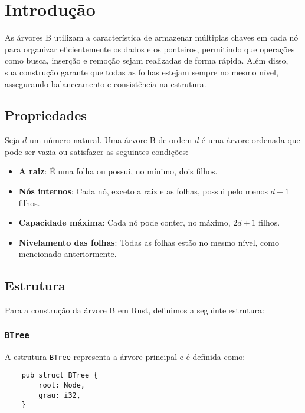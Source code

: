 \section{Introdução}

As árvores B utilizam a característica de armazenar múltiplas chaves 
em cada nó para organizar eficientemente os dados e os ponteiros, permitindo 
que operações como busca, inserção e remoção sejam realizadas de forma rápida. 
Além disso, sua construção garante que todas as folhas estejam sempre no mesmo nível, 
assegurando balanceamento e consistência na estrutura.


\subsection{Propriedades}

Seja \( d \) um número natural. Uma árvore B de ordem \( d \) é uma árvore ordenada 
que pode ser vazia ou satisfazer as seguintes condições:
\begin{itemize}
    \item \textbf{A raiz}: É uma folha ou possui, no mínimo, dois filhos.
    \item \textbf{Nós internos}: Cada nó, exceto a raiz e as folhas, possui pelo menos \( d + 1 \) filhos.
    \item \textbf{Capacidade máxima}: Cada nó pode conter, no máximo, \( 2d + 1 \) filhos.
    \item \textbf{Nivelamento das folhas}: Todas as folhas estão no mesmo nível, como mencionado anteriormente.
\end{itemize}

\subsection{Estrutura}

Para a construção da árvore B em Rust, definimos a seguinte estrutura:

\subsubsection{\texttt{BTree}}

A estrutura \texttt{BTree} representa a árvore principal e é definida como:

\begin{lstlisting}
    pub struct BTree {
        root: Node,
        grau: i32,
    }
\end{lstlisting}

